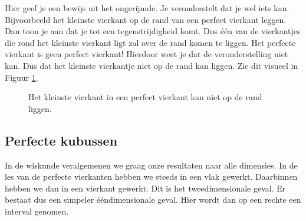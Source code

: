 

Hier geef je een bewijs uit het ongerijmde. Je veronderstelt dat je wel iets kan. Bijvoorbeeld het kleinste vierkant op de rand van een perfect vierkant leggen. Dan toon je aan dat je tot een tegenstrijdigheid komt. Dus \'e\'en van de vierkantjes die rond het kleinste vierkant ligt zal over de rand komen te liggen. Het perfecte vierkant is geen perfect vierkant! Hierdoor weet je dat de veronderstelling niet kan. Dus dat het kleinste vierkantje niet op de rand kan liggen. Zie dit visueel in Figuur \ref{fig:pv_kleinstevierkant}.

\begin{figure}
\begin{center}
  
\end{center}
\caption{Het kleinste vierkant in een perfect vierkant kan niet op de rand liggen.}
\label{fig:pv_kleinstevierkant}
\end{figure}

\subsection{Perfecte kubussen}

In de wiskunde veralgemenen we graag onze resultaten naar alle dimensies. In de les van de perfecte vierkanten hebben we steeds in een vlak gewerkt. Daarbinnen hebben we dan in een vierkant gewerkt. Dit is het tweedimensionale geval. Er bestaat dus een simpeler \'e\'endimensionale geval. Hier wordt dan op een rechte een interval genomen.%




